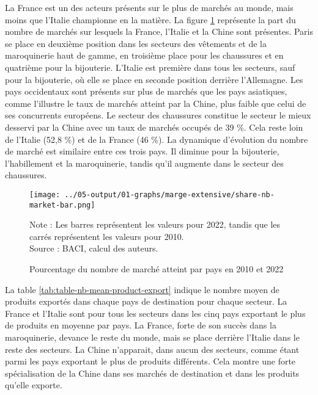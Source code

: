 \documentclass[french,10pt,a4paper]{article}
\begin{document}
La France est un des acteurs présents sur le plus de marchés au monde, mais moins que l'Italie championne en la matière. La figure \ref{fig:nb-market-bar} représente la part du nombre de marchés sur lesquels la France, l'Italie et la Chine sont présentes. Paris se place en deuxième position dans les secteurs des vêtements et de la maroquinerie haut de gamme, en troisième place pour les chaussures et en quatrième pour la bijouterie. L'Italie est première dans tous les secteurs, sauf pour la bijouterie, où elle se place en seconde position derrière l'Allemagne. Les pays occidentaux sont présents sur plus de marchés que les pays asiatiques, comme l'illustre le taux de marchés atteint par la Chine, plus faible que celui de ses concurrents européens. Le secteur des chaussures constitue le secteur le mieux desservi par la Chine avec un taux de marchés occupés de 39 \%. Cela reste loin de l'Italie (52,8 \%) et de la France (46 \%). La dynamique d'évolution du nombre de marché est similaire entre ces trois pays. Il diminue pour la bijouterie, l'habillement et la maroquinerie, tandis qu'il augmente dans le secteur des chaussures.

\begin{figure}[!h]
  \centering
  \texttt{[image: ../05-output/01-graphs/marge-extensive/share-nb-market-bar.png]}
  \captionsetup{justification=justified, singlelinecheck=false, font=small}
  \caption*{Note : Les barres représentent les valeurs pour 2022, tandis que les carrés représentent les valeurs pour 2010. \\
  Source : BACI, calcul des auteurs.}
  \captionsetup{justification=centering, singlelinecheck=true, font=normalsize}
  \caption{Pourcentage du nombre de marché atteint par pays en 2010 et 2022}
  \label{fig:nb-market-bar}
\end{figure}

La table \ref{tab:table-nb-mean-product-export} indique le nombre moyen de produits exportés dans chaque pays de destination pour chaque secteur. La France et l'Italie sont pour tous les secteurs dans les cinq pays exportant le plus de produits en moyenne par pays. La France, forte de son succès dans la maroquinerie, devance le reste du monde, mais se place derrière l'Italie dans le reste des secteurs. La Chine n'apparait, dans aucun des secteurs, comme étant parmi les pays exportant le plus de produits différents. Cela montre une forte spécialisation de la Chine dans ses marchés de destination et dans les produits qu'elle exporte. 
\end{document}
